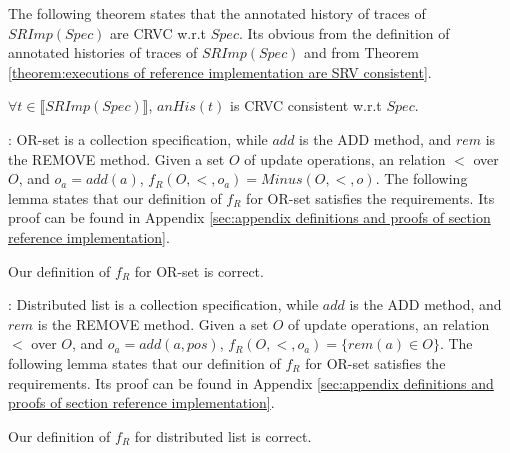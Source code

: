 
The following theorem states that the annotated history of traces of $SRImp(Spec)$ are CRVC w.r.t $Spec$. Its obvious from the definition of annotated histories of traces of $SRImp(Spec)$ and from Theorem \ref{theorem:executions of reference implementation are SRV consistent}.

\begin{lemma}
\label{lemma:the abstract trace of CRIMPSpec is a subset of the abstract trace of RIMPSpec}
$\forall t \in \llbracket SRImp(Spec) \rrbracket$, $anHis(t)$ is CRVC consistent w.r.t $Spec$.
\end{lemma}


: OR-set is a collection specification, while $add$ is the ADD method, and $rem$ is the REMOVE method. Given a set $O$ of update operations, an relation $<$ over $O$, and $o_a = add(a)$, $f_R(O,<,o_a) = Minus(O,<,o)$. The following lemma states that our definition of $f_R$ for OR-set satisfies the requirements. Its proof can be found in Appendix \ref{sec:appendix definitions and proofs of section reference implementation}.

\begin{lemma}
\label{lemma:Minus for OR-set is correct}
Our definition of $f_R$ for OR-set is correct.
\end{lemma}

: Distributed list is a collection specification, while $add$ is the ADD method, and $rem$ is the REMOVE method. Given a set $O$ of update operations, an relation $<$ over $O$, and $o_a = add(a,pos)$, $f_R(O,<,o_a) = \{ rem(a) \in O \}$. The following lemma states that our definition of $f_R$ for OR-set satisfies the requirements. Its proof can be found in Appendix \ref{sec:appendix definitions and proofs of section reference implementation}.

\begin{lemma}
\label{lemma:Minus for distributed list is correct}
Our definition of $f_R$ for distributed list is correct.
\end{lemma}


